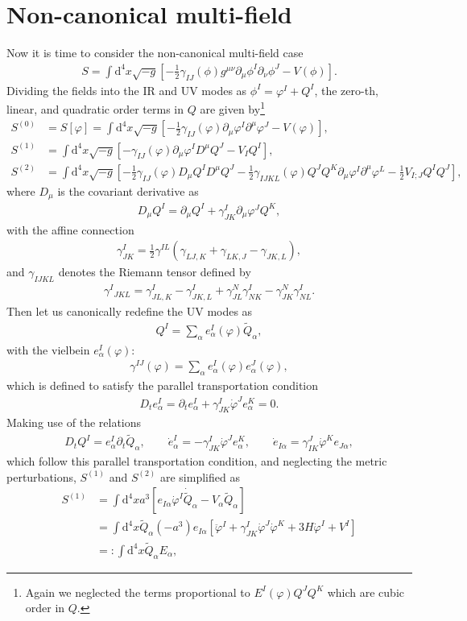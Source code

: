 \documentclass[aps, prd
, preprint
, nofootinbib 
]{revtex4-1}
\newcommand{\dd}{\mathrm{d}}
\newcommand{\bae}[1]{\begin{align} #1 \end{align}}
\begin{document}
\section{Non-canonical multi-field}

Now it is time to consider the non-canonical multi-field case
\bae{
	S=\int\dd^4x\sqrt{-g}\left[-\frac{1}{2}\gamma_{IJ}(\phi)g^{\mu\nu}\partial_\mu\phi^I\partial_\nu\phi^J-V(\phi)\right].
}
Dividing the fields into the IR and UV modes as $\phi^I=\varphi^I+Q^I$, the zero-th, linear, and quadratic order terms in $Q$ are 
given by\footnote{Again
we neglected the terms proportional to $E^I(\varphi)Q^JQ^K$ which are cubic order in $Q$.}
\bae{
	S^{(0)}&=S[\varphi]=\int\dd^4x\sqrt{-g}\left[-\frac{1}{2}\gamma_{IJ}(\varphi)\partial_\mu\varphi^I\partial^\mu\varphi^J-V(\varphi)\right], \\
	S^{(1)}&=\int\dd^4x\sqrt{-g}\left[-\gamma_{IJ}(\varphi)\partial_\mu\varphi^ID^\mu Q^J-V_IQ^I\right], \\
	S^{(2)}&=\int\dd^4x\sqrt{-g}\left[-\frac{1}{2}\gamma_{IJ}(\varphi)D_\mu Q^ID^\mu Q^J
	-\frac{1}{2}\gamma_{IJKL}(\varphi)Q^JQ^K\partial_\mu\varphi^I\partial^\mu\varphi^L-\frac{1}{2}V_{I;J}Q^IQ^J\right],
}
where $D_\mu$ is the covariant derivative as
\bae{
	D_\mu Q^I=\partial_\mu Q^I+\gamma^I_{JK}\partial_\mu\varphi^JQ^K,
}
with the affine connection
\bae{
	\gamma^I_{JK}=\frac{1}{2}\gamma^{IL}\left(\gamma_{LJ,K}+\gamma_{LK,J}-\gamma_{JK,L}\right),
}
and $\gamma_{IJKL}$ denotes the Riemann tensor defined by
\bae{
	\gamma^I{}_{JKL}=\gamma^I_{JL,K}-\gamma^I_{JK,L}+\gamma^N_{JL}\gamma^I_{NK}-\gamma^N_{JK}\gamma^I_{NL}.
}
Then let us canonically redefine the UV modes as
\bae{
	Q^I=\sum_\alpha e^I_\alpha(\varphi)\tilde{Q}_\alpha,
}
with the vielbein $e^I_\alpha(\varphi)$:
\bae{
	\gamma^{IJ}(\varphi)=\sum_\alpha e^I_\alpha(\varphi)e^J_\alpha(\varphi),
}
which is defined to satisfy the parallel transportation condition
\bae{\label{eq: parallel transport}
	D_te^I_\alpha=\partial_te^I_\alpha+\gamma^I_{JK}\dot{\varphi}^Je^K_\alpha=0.
}
Making use of the relations
\bae{
	D_tQ^I=e^I_\alpha\partial_t\tilde{Q}_\alpha, \quad\quad \dot{e}^I_\alpha=-\gamma^I_{JK}\dot{\varphi}^Je^K_\alpha,
	\quad\quad \dot{e}_{I\alpha}=\gamma^J_{IK}\dot{\varphi}^Ke_{J\alpha},
}
which follow this parallel transportation condition, and neglecting the metric perturbations,
$S^{(1)}$ and $S^{(2)}$ are simplified as
\bae{
	S^{(1)}&=\int\dd^4xa^3\left[e_{I\alpha}\dot{\varphi}^I\dot{\tilde{Q}}_\alpha-V_\alpha\tilde{Q}_\alpha\right] \nonumber \\
	&=\int\dd^4x\tilde{Q}_\alpha(-a^3)e_{I\alpha}\left[\ddot{\varphi}^I+\gamma^I_{JK}\dot{\varphi}^J\dot{\varphi}^K
	+3H\dot{\varphi}^I+V^I\right] \nonumber \\
	&=:\int\dd^4x\tilde{Q}_\alpha E_\alpha,
}
\end{document}
